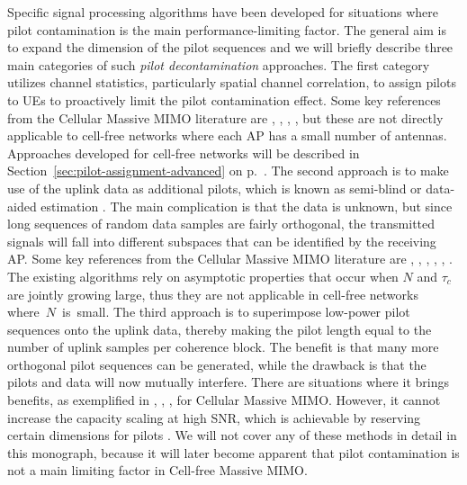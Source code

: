 \begin{remark} \label{remark:decontamination}
Specific signal processing algorithms have been developed for situations where pilot contamination is the main performance-limiting factor. The general aim is to expand the dimension of the pilot sequences and we will briefly describe three main categories of such \emph{pilot decontamination} approaches. The first category utilizes channel statistics, particularly spatial channel correlation, to assign pilots to UEs to proactively limit the pilot contamination effect. Some key references from the Cellular Massive MIMO literature are \cite{BjornsonHS17}, \cite{Huh2012a}, \cite{Yin2013a}, \cite{Xu2015a}, but these are not directly applicable to cell-free networks where each AP has a small number of antennas. Approaches developed for cell-free networks will be described in Section~\ref{sec:pilot-assignment-advanced} on p.~\pageref{sec:pilot-assignment-advanced}.
The second approach is to make use of the uplink data as additional pilots, which is known as semi-blind or data-aided estimation \cite{Carvalho1997a}. The main complication is that the data is unknown, but since long sequences of random data samples are fairly orthogonal, the transmitted signals will fall into different subspaces that can be identified by the receiving AP.
Some key references from the Cellular Massive MIMO literature are \cite{Ma2014a}, \cite{Mueller2014b}, \cite{Neumann2014a}, \cite{Ngo2012a}, \cite{Vinogradova2016a}, \cite{Yin2016a}. The existing algorithms rely \linebreak on asymptotic properties that occur when $N$ and $\tau_c$ are jointly growing large, thus they are not applicable in cell-free networks where~$N$~is~small. The third approach is to superimpose low-power pilot sequences onto the uplink data, thereby making the pilot length equal to the number of uplink samples per coherence block. The benefit is that many more orthogonal pilot sequences can be generated, while the drawback is that the pilots and data will now mutually interfere. There are situations where it brings benefits, as exemplified in \cite{Upadhya2014a}, \cite{Upadhya2017b}, \cite{Verenzuela2017a}, \cite{Verenzuela2020a} for Cellular Massive MIMO. However, it cannot increase the capacity scaling at high SNR, which is achievable by reserving certain dimensions for pilots \cite{Zheng2002a}. We will not cover any of these methods in detail in this monograph, because it will later become apparent that pilot contamination is not a main limiting factor in Cell-free Massive MIMO.
\end{remark}


